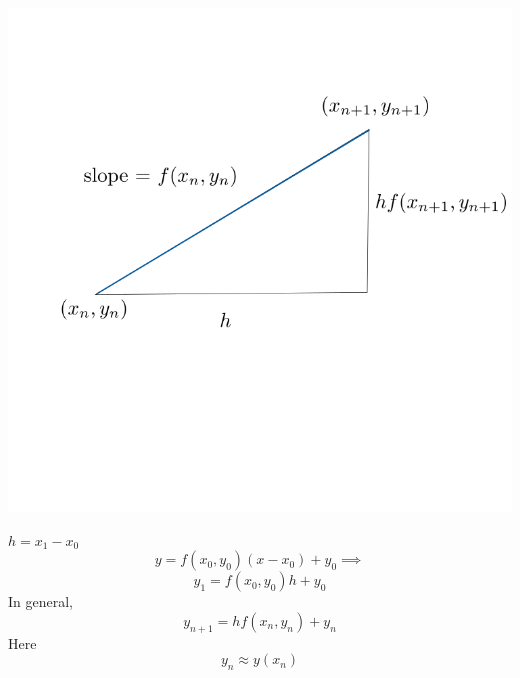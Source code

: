 \documentclass[10pt,a4paper]{article}
\theoremstyle{definition}
\begin{document}
  \begin{flushleft}
    \includegraphics[scale=.3]{euler2}
  \end{flushleft}
  \( h = x_1-x_0 \)
  \[ y = f(x_0, y_0)(x-x_0) + y_0 \implies \]
  \[ y_1 = f(x_0, y_0)h + y_0 \]
  In general, 
  \[ \boxed{ y_{n+1} = hf(x_n,y_n) + y_n} \]
  Here
  \[ \boxed{ y_n \approx y(x_n)} \]
\end{document}
